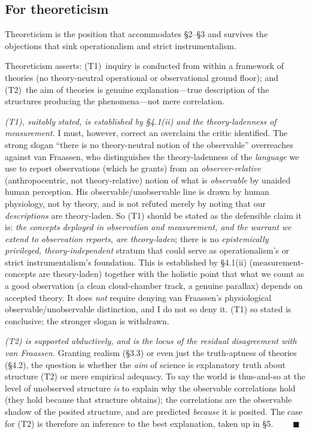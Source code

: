\documentclass[12pt]{article}
\begin{document}
\subsection{For theoreticism}

\begin{description}[leftmargin=1.6em,style=nextline]
\item[Claim 6.] Theoreticism is the position that accommodates \S2--\S3
and survives the objections that sink operationalism and strict
instrumentalism.
\end{description}

Theoreticism asserts: (T1)~inquiry is conducted from within a framework of
theories (no theory-neutral operational or observational ground floor);
and (T2)~the aim of theories is genuine explanation---true description of
the structures producing the phenomena---not mere correlation.

\emph{(T1), suitably stated, is established by \S4.1(ii) and the
theory-ladenness of measurement.} I must, however, correct an overclaim
the critic identified. The strong slogan ``there is no theory-neutral
notion of the observable'' overreaches against van Fraassen, who
distinguishes the theory-ladenness of the \emph{language} we use to report
observations (which he grants) from an \emph{observer-relative}
(anthropocentric, not theory-relative) notion of what is \emph{observable}
by unaided human perception. His observable/unobservable line is drawn by
human physiology, not by theory, and is not refuted merely by noting that
our \emph{descriptions} are theory-laden. So (T1) should be stated as the
defensible claim it is: \emph{the concepts deployed in observation and
measurement, and the warrant we extend to observation reports, are
theory-laden}; there is no \emph{epistemically privileged,
theory-independent} stratum that could serve as operationalism's or
strict instrumentalism's foundation. This is established by \S4.1(ii)
(measurement-concepts are theory-laden) together with the holistic point
that what we count as a good observation (a clean cloud-chamber track, a
genuine parallax) depends on accepted theory. It does \emph{not} require
denying van Fraassen's physiological observable/unobservable distinction,
and I do not so deny it. (T1) so stated is conclusive; the stronger slogan
is withdrawn.

\emph{(T2) is supported abductively, and is the locus of the residual
disagreement with van Fraassen.} Granting realism (\S3.3) or even just
the truth-aptness of theories (\S4.2), the question is whether the
\emph{aim} of science is explanatory truth about structure (T2) or mere
empirical adequacy. To say the world is thus-and-so at the level of
unobserved structure \emph{is} to explain why the observable
correlations hold (they hold because that structure obtains); the
correlations are the observable shadow of the posited structure, and are
predicted \emph{because} it is posited. The case for (T2) is therefore an
inference to the best explanation, taken up in \S5.
$\qquad\blacksquare$
\end{document}
